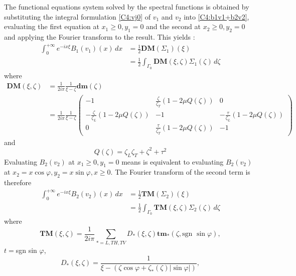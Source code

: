 The functional equations system solved by the spectral functions is obtained by substituting the integral formulation \eqref{C4:vj0} of $v_1$ and $v_2$ into \eqref{C4:b1v1+b2v2}, evaluating the first equation at $x_1\geq 0, y_1=0$ and the second at $x_2\geq 0, y_2=0$ and applying the Fourier transform to the result. This yields :
\begin{equation}
\begin{split}
\int_0^{+\infty} e^{-ix\xi}B_1(v_1)(x)\,dx&=\frac{1}{2}\textbf{DM}(\Sigma_1)(\xi) \\
&=\frac{1}{2} \int_{\Gamma_0}\textbf{DM}(\xi,\zeta)\Sigma_1(\zeta)\,d\zeta
\end{split}
\label{C4:B1DM}
\end{equation}
where
\begin{equation}
\begin{split}
\textbf{DM}(\xi,\zeta)&=\frac{1}{2i\pi} \frac{1}{\xi-\zeta} \textbf{dm}(\zeta) \\
&=\frac{1}{2i\pi} \frac{1}{\xi-\zeta} \begin{pmatrix}
-1 & \frac{\zeta}{\zeta_T}(1-2\mu Q(\zeta)) & 0\\
-\frac{\zeta}{\zeta_L}(1-2\mu Q(\zeta))  & -1&-\frac{\tau}{\zeta_L}(1-2\mu Q(\zeta)) \\
0&\frac{\tau}{\zeta_T}(1-2\mu Q(\zeta)) &-1
\end{pmatrix}
 \end{split}
\label{C4:defDM}
\end{equation}
and
\begin{equation}
Q(\zeta) =\zeta_L\zeta_T+\zeta^2+\tau^2
\end{equation}
Evaluating $B_2(v_2)$ at $x_1\geq 0, y_1=0$ means is equivalent to evaluating $B_2(v_2)$ at $x_2=x\cos\varphi, y_2=x\sin\varphi, x\geq 0$. The Fourier transform of the second term is therefore
\begin{equation}
\begin{split}
\int_0^{+\infty} e^{-ix\xi}B_2(v_2)(x)\,dx&=\frac{1}{2}\textbf{TM}(\Sigma_2)(\xi) \\
&=\frac{1}{2} \int_{\Gamma_0}\textbf{TM}(\xi,\zeta)\Sigma_2(\zeta)\,d\zeta
\end{split}
\label{C4:B2TM}
\end{equation}
where
\begin{equation}
\textbf{TM}(\xi,\zeta)=\frac{1}{2i\pi}\sum_{*=L,TH,TV}D_*(\xi,\zeta)\textbf{tm}_*(\zeta,\mbox{sgn } \sin \varphi),
\label{C4:defTM}
\end{equation}
$t=$sgn sin $\varphi$,
\begin{equation}
D_*(\xi,\zeta)=\frac{1}{\xi-(\zeta \cos \varphi + \zeta_*(\zeta) |\sin \varphi|)},
\end{equation}
